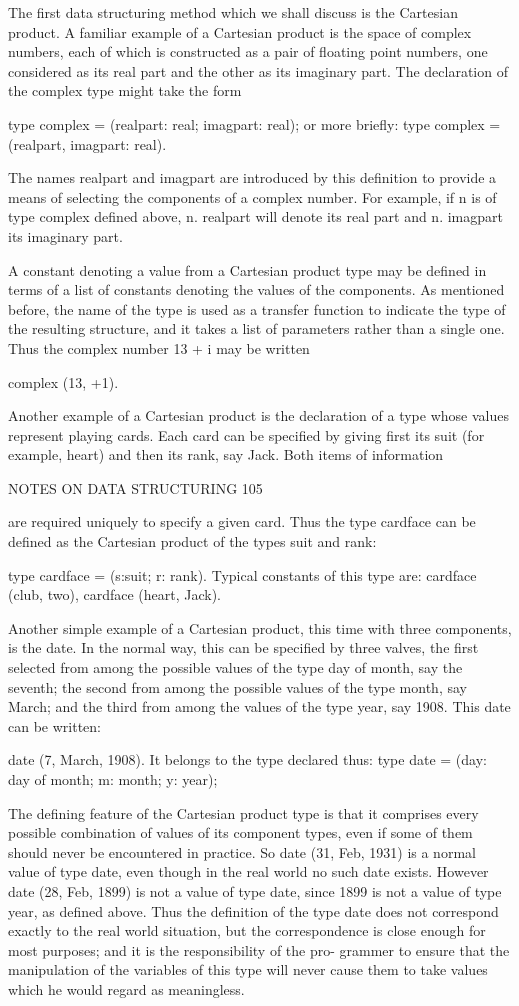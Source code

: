 The first data structuring method which we shall discuss is the Cartesian product. A familiar example of a Cartesian product is the space of complex numbers, each of which is constructed as a pair of floating point numbers, one considered as its real part and the other as its imaginary part. The declaration of the complex type might take the form

type complex = (realpart: real; imagpart: real); or more briefly: type complex = (realpart, imagpart: real).

The names realpart and imagpart are introduced by this definition to provide a means of selecting the components of a complex number. For example, if n is of type complex defined above, n. realpart will denote its real part and n. imagpart its imaginary part.

A constant denoting a value from a Cartesian product type may be defined in terms of a list of constants denoting the values of the components. As mentioned before, the name of the type is used as a transfer function to indicate the type of the resulting structure, and it takes a list of parameters rather than a single one. Thus the complex number 13 + i may be written

complex (13, +1).

Another example of a Cartesian product is the declaration of a type whose values represent playing cards. Each card can be specified by giving first its suit (for example, heart) and then its rank, say Jack. Both items of information

NOTES ON DATA STRUCTURING 105

are required uniquely to specify a given card. Thus the type cardface can be defined as the Cartesian product of the types suit and rank:

type cardface = (s:suit; r: rank). Typical constants of this type are: cardface (club, two), cardface (heart, Jack).

Another simple example of a Cartesian product, this time with three components, is the date. In the normal way, this can be specified by three valves, the first selected from among the possible values of the type day of month, say the seventh; the second from among the possible values of the type month, say March; and the third from among the values of the type year, say 1908. This date can be written:

date (7, March, 1908). It belongs to the type declared thus: type date = (day: day of month; m: month; y: year);

The defining feature of the Cartesian product type is that it comprises every possible combination of values of its component types, even if some of them should never be encountered in practice. So date (31, Feb, 1931) is a normal value of type date, even though in the real world no such date exists. However date (28, Feb, 1899) is not a value of type date, since 1899 is not a value of type year, as defined above. Thus the definition of the type date does not correspond exactly to the real world situation, but the correspondence is close enough for most purposes; and it is the responsibility of the pro- grammer to ensure that the manipulation of the variables of this type will never cause them to take values which he would regard as meaningless.

